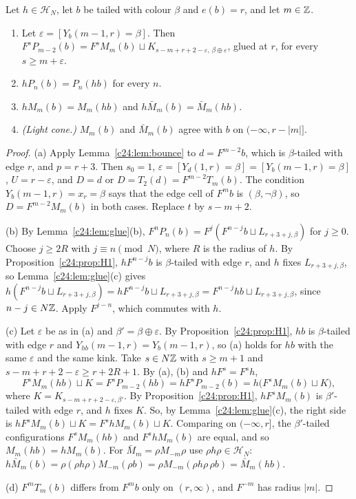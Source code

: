 \begin{lemma}\label{c24:lem:moves}
Let $h\in\mathcal H_N$, let $b$ be tailed with colour $\beta$ and $e(b)=r$, and let $m\in\mathbb{Z}$.
\begin{enumerate}
\item[(a)] Let $\varepsilon=[Y_b(m-1,r)=\beta]$. Then $F^sP_{m-2}(b)=F^sM_m(b)\sqcup K_{s-m+r+2-\varepsilon,\,\beta\oplus\varepsilon}$, glued at $r$, for every $s\ge m+\varepsilon$.
\item[(b)] $hP_n(b)=P_n(hb)$ for every $n$.
\item[(c)] $hM_m(b)=M_m(hb)$ and $h\bar M_m(b)=\bar M_m(hb)$.
\item[(d)] \emph{(Light cone.)} $M_m(b)$ and $\bar M_m(b)$ agree with $b$ on $(-\infty,r-|m|]$.
\end{enumerate}
\end{lemma}

\begin{proof}
(a) Apply Lemma~\ref{c24:lem:bounce} to $d=F^{m-2}b$, which is $\beta$-tailed with edge $r$, and $p=r+3$. Then $s_0=1$, $\varepsilon=[Y_d(1,r)=\beta]=[Y_b(m-1,r)=\beta]$, $U=r-\varepsilon$, and $D=d$ or $D=T_2(d)=F^{m-2}T_m(b)$. The condition $Y_b(m-1,r)=x_r=\beta$ says that the edge cell of $F^mb$ is $(\beta,\neg\beta)$, so $D=F^{m-2}M_m(b)$ in both cases. Replace $t$ by $s-m+2$.

(b) By Lemma~\ref{c24:lem:glue}(b), $F^nP_n(b)=F^j(F^{n-j}b\sqcup L_{r+3+j,\beta})$ for $j\ge0$. Choose $j\ge2R$ with $j\equiv n\pmod N$, where $R$ is the radius of $h$. By Proposition~\ref{c24:prop:H1}, $hF^{n-j}b$ is $\beta$-tailed with edge $r$, and $h$ fixes $L_{r+3+j,\beta}$, so Lemma~\ref{c24:lem:glue}(c) gives $h(F^{n-j}b\sqcup L_{r+3+j,\beta})=hF^{n-j}b\sqcup L_{r+3+j,\beta}=F^{n-j}hb\sqcup L_{r+3+j,\beta}$, since $n-j\in N\mathbb{Z}$. Apply $F^{j-n}$, which commutes with $h$.

(c) Let $\varepsilon$ be as in (a) and $\beta'=\beta\oplus\varepsilon$. By Proposition~\ref{c24:prop:H1}, $hb$ is $\beta$-tailed with edge $r$ and $Y_{hb}(m-1,r)=Y_b(m-1,r)$, so (a) holds for $hb$ with the same $\varepsilon$ and the same kink. Take $s\in N\mathbb{Z}$ with $s\ge m+1$ and $s-m+r+2-\varepsilon\ge r+2R+1$. By (a), (b) and $hF^s=F^sh$,
\[
F^sM_m(hb)\sqcup K=F^sP_{m-2}(hb)=hF^sP_{m-2}(b)=h\bigl(F^sM_m(b)\sqcup K\bigr),
\]
where $K=K_{s-m+r+2-\varepsilon,\beta'}$. By Proposition~\ref{c24:prop:H1}, $hF^sM_m(b)$ is $\beta'$-tailed with edge $r$, and $h$ fixes $K$. So, by Lemma~\ref{c24:lem:glue}(c), the right side is $hF^sM_m(b)\sqcup K=F^shM_m(b)\sqcup K$. Comparing on $(-\infty,r]$, the $\beta'$-tailed configurations $F^sM_m(hb)$ and $F^shM_m(b)$ are equal, and so $M_m(hb)=hM_m(b)$. For $\bar M_m=\rho M_{-m}\rho$ use $\rho h\rho\in\mathcal H_N$: $h\bar M_m(b)=\rho(\rho h\rho)M_{-m}(\rho b)=\rho M_{-m}(\rho h\rho\,\rho b)=\bar M_m(hb)$.

(d) $F^mT_m(b)$ differs from $F^mb$ only on $(r,\infty)$, and $F^{-m}$ has radius $|m|$.
\end{proof}

